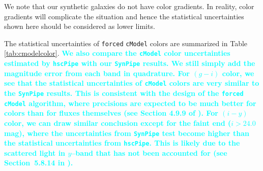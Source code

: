 \documentclass[useamsfonts]{pasj01}
\def\hscpipe{\texttt{hscPipe}}
\def\synpipe{\texttt{SynPipe}}
\def\cmodel{\texttt{cModel}}
\def\forced{\texttt{forced}}
\newcommand{\song}[1]{\textcolor{cyan} {\textbf{#1}}}
\begin{document}
    We note that our synthetic galaxies do not have color gradients.  
    In reality, color gradients will complicate the situation and hence the statistical 
    uncertainties shown here should be considered as lower limits.

	The statistical uncertainties of \forced{} \cmodel{} colors are summarized in 
	Table \ref{tab:cmodelcolor}. 
	\song{
	We also compare the \cmodel{} color uncertainties estimated by \hscpipe{} with 
	our \synpipe{} results. 
	We still simply add the magnitude error from each band in quadrature.
	For $(g-i)$ color, we see that the statistical uncertainties of \cmodel{} colors 
	are very similar to the \synpipe{} results. 
	This is consistent with the design of the \forced{} \cmodel{} algorithm, where 
	precisions are expected to be much better for colors than for fluxes themselves 
	(see Section 4.9.9 of \citealt{Bosch2017}).
	For $(i-y)$ color, we can draw similar conclusion except for the faint end 
	($i>24.0$ mag), where the uncertainties from \synpipe{} test become higher than 
	the statistical uncertainties from \hscpipe{}. 
	This is likely due to the scattered light in $y$--band that has not been accounted 
	for (see Section~5.8.14 in \citealt{HSCDR1}). 
	}
    
\end{document}
